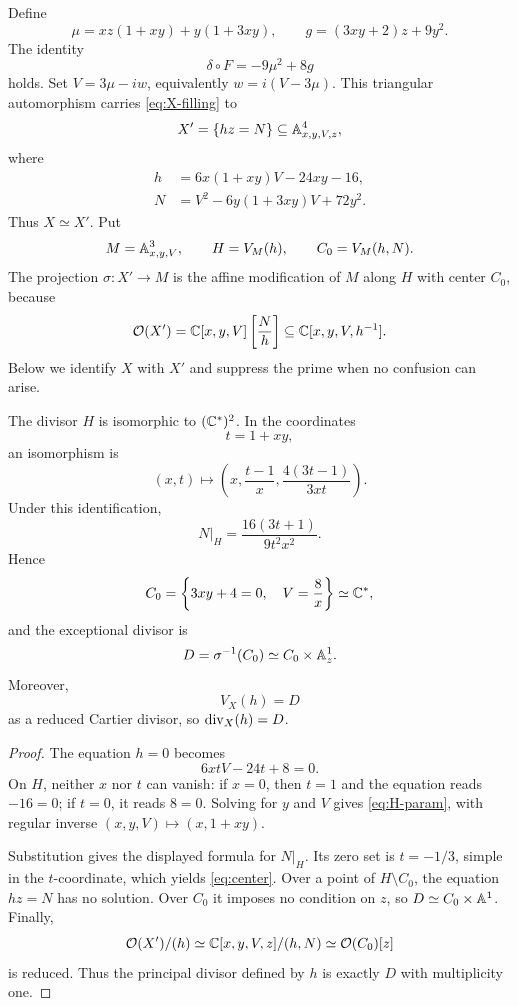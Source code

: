 \begin{construction}\label{con:affine-modification-presentation}
Define
\begin{equation}\label{eq:mu-g}
  \mu=xz(1+xy)+y(1+3xy),
  \qquad
  g=(3xy+2)z+9y^2.
\end{equation}
The identity
\begin{equation}\label{eq:delta-identity}
  \delta\circ F=-9\mu^2+8g
\end{equation}
holds.  Set $V=3\mu-iw$, equivalently $w=i(V-3\mu)$.  This triangular automorphism carries \eqref{eq:X-filling} to
\begin{equation}\label{eq:hzN}
  X'=\{hz=N\}\subseteq\mathbb A^4_{x,y,V,z},
\end{equation}
where
\begin{equation}\label{eq:hN}
\begin{aligned}
  h&=6x(1+xy)V-24xy-16,\\
  N&=V^2-6y(1+3xy)V+72y^2.
\end{aligned}
\end{equation}
Thus $X\simeq X'$.  Put
\[
  M=\mathbb A^3_{x,y,V},
  \qquad H=V_M(h),
  \qquad C_0=V_M(h,N).
\]
The projection $\sigma\colon X'\to M$ is the affine modification of $M$ along $H$ with center $C_0$, because
\[
  \mathcal O(X')=\mathbb C[x,y,V]\left[\frac Nh\right]\subseteq\mathbb C[x,y,V,h^{-1}].
\]
Below we identify $X$ with $X'$ and suppress the prime when no confusion can arise.
\end{construction}

\begin{proposition}\label{prop:modification-geometry}
The divisor $H$ is isomorphic to $(\mathbb C^*)^2$.  In the coordinates
\[
  t=1+xy,
\]
an isomorphism is
\begin{equation}\label{eq:H-param}
  (x,t)\longmapsto
  \left(x,\frac{t-1}{x},\frac{4(3t-1)}{3xt}\right).
\end{equation}
Under this identification,
\[
  N|_H=\frac{16(3t+1)}{9t^2x^2}.
\]
Hence
\begin{equation}\label{eq:center}
  C_0=\left\{3xy+4=0,\quad V=\frac8x\right\}
  \simeq\mathbb C^*,
\end{equation}
and the exceptional divisor is
\[
  D=\sigma^{-1}(C_0)\simeq C_0\times\mathbb A^1_z.
\]
Moreover,
\[
  V_X(h)=D
\]
as a reduced Cartier divisor, so $\operatorname{div}_X(h)=D$.
\end{proposition}

\begin{proof}
The equation $h=0$ becomes
\[
  6xtV-24t+8=0.
\]
On $H$, neither $x$ nor $t$ can vanish: if $x=0$, then $t=1$ and the equation reads $-16=0$; if $t=0$, it reads $8=0$.  Solving for $y$ and $V$ gives \eqref{eq:H-param}, with regular inverse $(x,y,V)\mapsto(x,1+xy)$.

Substitution gives the displayed formula for $N|_H$.  Its zero set is $t=-1/3$, simple in the $t$-coordinate, which yields \eqref{eq:center}.  Over a point of $H\setminus C_0$, the equation $hz=N$ has no solution.  Over $C_0$ it imposes no condition on $z$, so $D\simeq C_0\times\mathbb A^1$.  Finally,
\[
  \mathcal O(X')/(h)
  \simeq\mathbb C[x,y,V,z]/(h,N)
  \simeq\mathcal O(C_0)[z]
\]
is reduced.  Thus the principal divisor defined by $h$ is exactly $D$ with multiplicity one.
\end{proof}


